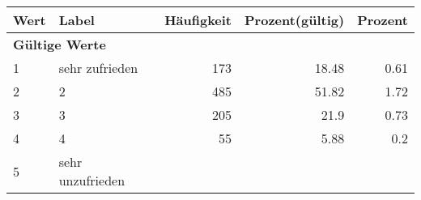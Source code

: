      \begin{longtable}{lXrrr}
     \toprule
     \textbf{Wert} & \textbf{Label} & \textbf{Häufigkeit} & \textbf{Prozent(gültig)} & \textbf{Prozent} \\
     \endhead
     \midrule
     \multicolumn{5}{l}{\textbf{Gültige Werte}}\\

     1 &
     \multicolumn{1}{X}{ sehr zufrieden   } &


       \num{173} &
       \num[round-mode=places,round-precision=2]{18,48} &
         \num[round-mode=places,round-precision=2]{0,61} \\

     2 &
     \multicolumn{1}{X}{ 2   } &


       \num{485} &
       \num[round-mode=places,round-precision=2]{51,82} &
         \num[round-mode=places,round-precision=2]{1,72} \\

     3 &
     \multicolumn{1}{X}{ 3   } &


       \num{205} &
       \num[round-mode=places,round-precision=2]{21,9} &
         \num[round-mode=places,round-precision=2]{0,73} \\

     4 &
     \multicolumn{1}{X}{ 4   } &


       \num{55} &
       \num[round-mode=places,round-precision=2]{5,88} &
         \num[round-mode=places,round-precision=2]{0,2} \\

     5 &
     \multicolumn{1}{X}{ sehr unzufrieden   } &



\end{longtable}
